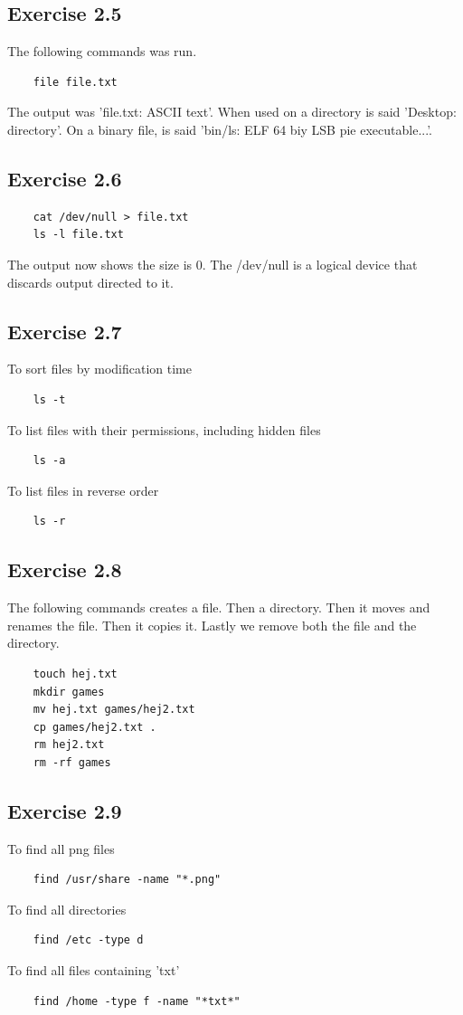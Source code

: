 \documentclass{article}
\begin{document}
\subsection{Exercise 2.5}
The following commands was run.
\begin{verbatim}
	file file.txt
\end{verbatim}
The output was 'file.txt: ASCII text'.
When used on a directory is said 'Desktop: directory'.
On a binary file, is said 'bin/ls: ELF 64 biy LSB pie executable...'.

\subsection{Exercise 2.6}
\begin{verbatim}
	cat /dev/null > file.txt
	ls -l file.txt
\end{verbatim}
The output now shows the size is 0.
The /dev/null is a logical device that discards output directed to it.

\subsection{Exercise 2.7}
To sort files by modification time
\begin{verbatim}
	ls -t
\end{verbatim}
To list files with their permissions, including hidden files
\begin{verbatim}
	ls -a
\end{verbatim}
To list files in reverse order
\begin{verbatim}
	ls -r
\end{verbatim}

\subsection{Exercise 2.8}
The following commands creates a file. Then a directory. Then it moves and renames the file. Then it copies it. Lastly we remove both the file and the directory.
\begin{verbatim}
	touch hej.txt
	mkdir games
	mv hej.txt games/hej2.txt
	cp games/hej2.txt .
	rm hej2.txt
	rm -rf games
\end{verbatim}

\subsection{Exercise 2.9}
To find all png files
\begin{verbatim}
	find /usr/share -name "*.png"
\end{verbatim}
To find all directories
\begin{verbatim}
	find /etc -type d
\end{verbatim}
To find all files containing 'txt'
\begin{verbatim}
	find /home -type f -name "*txt*"
\end{verbatim}
\end{document}
